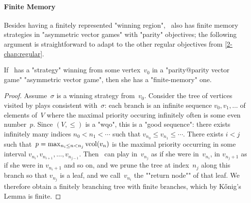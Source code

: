 \paragraph{Finite Memory} 
Besides having a finitely represented "winning region", \Eve\ also has
finite memory strategies in "asymmetric vector games" with "parity"
objectives; the following argument is straightforward to adapt to
the other regular objectives from \cref{2-chap:regular}.
\begin{lemma}\label{11-fact-finmem}
  If \Eve\ has a "strategy" winning from some vertex~$v_0$ in a
  "parity@parity vector game" "asymmetric vector game", then she has a
  "finite-memory" one.
\end{lemma}
\begin{proof}
  Assume~$\sigma$ is a winning strategy from~$v_0$.  Consider the tree
  of vertices visited by plays consistent with~$\sigma$: each branch
  is an infinite sequence $v_0,v_1,\dots$ of elements of~$V$ where the
  maximal priority occuring infinitely often is some even number~$p$.
  Since $(V,{\leq})$ is a "wqo", this is a "good sequence": there
  exists infinitely many indices $n_0<n_1<\cdots$ such that
  $v_{n_0}\leq v_{n_1}\leq\cdots$.  There exists $i<j$ such
  that~$p=\max_{n_i\leq n<n_j}\mathrm{vcol}(v_n)$ is the maximal priority
  occurring in some interval $v_{n_i},v_{n_{i+1}},\dots,v_{n_{j-1}}$.
  Then \Eve\ can play in~$v_{n_j}$ as if she were in~$v_{n_i}$, in
  $v_{n_j+1}$ as if she were in $v_{n_i+1}$ and so on, and we prune
  the tree at index~$n_j$ along this branch so that $v_{n_j}$ is a
  leaf, and we call~$v_{n_i}$ the ""return node"" of that leaf.  We
  therefore obtain a finitely branching tree with finite branches,
  which by K\H{o}nig's Lemma is finite.


\end{proof}
